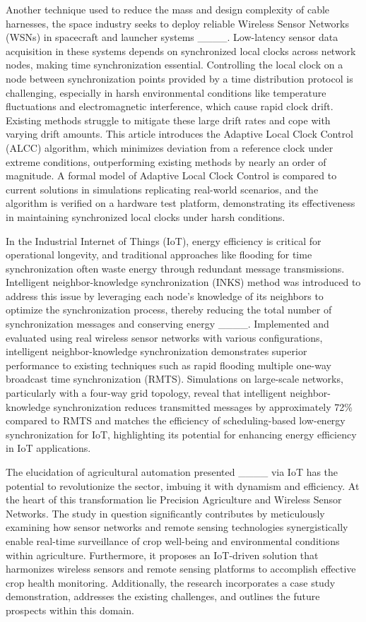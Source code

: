 Another technique used to reduce the mass and design complexity of cable harnesses, the space industry seeks to deploy reliable Wireless Sensor Networks (WSNs) in spacecraft and launcher systems ____. Low-latency sensor data acquisition in these systems depends on synchronized local clocks across network nodes, making time synchronization essential. Controlling the local clock on a node between synchronization points provided by a time distribution protocol is challenging, especially in harsh environmental conditions like temperature fluctuations and electromagnetic interference, which cause rapid clock drift. Existing methods struggle to mitigate these large drift rates and cope with varying drift amounts. This article introduces the Adaptive Local Clock Control (ALCC) algorithm, which minimizes deviation from a reference clock under extreme conditions, outperforming existing methods by nearly an order of magnitude. A formal model of Adaptive Local Clock Control is compared to current solutions in simulations replicating real-world scenarios, and the algorithm is verified on a hardware test platform, demonstrating its effectiveness in maintaining synchronized local clocks under harsh conditions.

In the Industrial Internet of Things (IoT), energy efficiency is critical for operational longevity, and traditional approaches like flooding for time synchronization often waste energy through redundant message transmissions. Intelligent neighbor-knowledge synchronization (INKS) method was introduced to address this issue by leveraging each node's knowledge of its neighbors to optimize the synchronization process, thereby reducing the total number of synchronization messages and conserving energy ____. Implemented and evaluated using real wireless sensor networks with various configurations, intelligent neighbor-knowledge synchronization demonstrates superior performance to existing techniques such as rapid flooding multiple one-way broadcast time synchronization (RMTS). Simulations on large-scale networks, particularly with a four-way grid topology, reveal that intelligent neighbor-knowledge synchronization reduces transmitted messages by approximately 72\% compared to RMTS and matches the efficiency of scheduling-based low-energy synchronization for IoT, highlighting its potential for enhancing energy efficiency in IoT applications.

The elucidation of agricultural automation presented ____ via IoT has the potential to revolutionize the sector, imbuing it with dynamism and efficiency. At the heart of this transformation lie Precision Agriculture and Wireless Sensor Networks. The study in question significantly contributes by meticulously examining how sensor networks and remote sensing technologies synergistically enable real-time surveillance of crop well-being and environmental conditions within agriculture. Furthermore, it proposes an IoT-driven solution that harmonizes wireless sensors and remote sensing platforms to accomplish effective crop health monitoring. Additionally, the research incorporates a case study demonstration, addresses the existing challenges, and outlines the future prospects within this domain.


